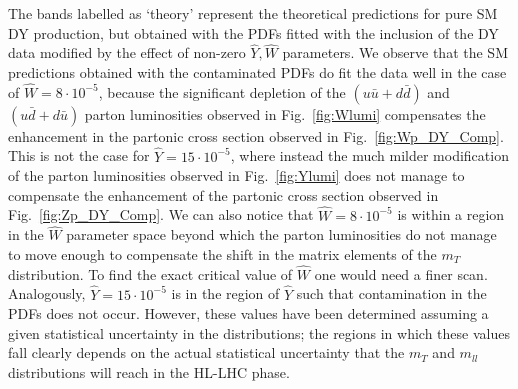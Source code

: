 \documentclass[withindex,glossary]{cam-thesis}
\begin{document}
The bands labelled as `theory' represent the theoretical predictions for pure SM DY production, but obtained with the 
PDFs fitted with the inclusion of the DY data modified by the effect of non-zero $\hat{Y},\hat{W}$ parameters. 
We observe that the SM predictions obtained with the contaminated PDFs do fit the data well in the case of $\hat{W}=8\cdot 10^{-5}$, 
because the significant depletion of the $(u\bar{u}+d\bar{d})$ and $(u\bar{d}+d\bar{u})$ parton luminosities observed in Fig.~\ref{fig:Wlumi} compensates 
the enhancement in the partonic cross section observed in Fig.~\ref{fig:Wp_DY_Comp}. This is not the case for $\hat{Y}=15\cdot 10^{-5}$, where instead the 
much milder modification of the parton luminosities observed in Fig.~\ref{fig:Ylumi} does not manage to compensate the enhancement of the partonic cross 
section observed in Fig.~\ref{fig:Zp_DY_Comp}. We can also notice that $\hat{W}=8\cdot 10^{-5}$ is within a region in the $\hat{W}$ parameter space 
beyond which the parton luminosities do not manage to move enough to compensate the shift in the matrix elements of the $m_T$ distribution. 
To find the exact critical value of $\hat{W}$ one would need a finer scan.
Analogously, $\hat{Y}=15\cdot 10^{-5}$ is in the region of $\hat{Y}$ such that  contamination in the PDFs does not occur.
However, these values have been determined assuming a given statistical uncertainty in the distributions;
the regions in which these values fall clearly depends on the actual statistical 
uncertainty that the $m_T$ and $m_{ll}$ distributions will reach in the HL-LHC phase. 
\end{document}
